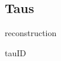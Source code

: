 \subsection{Taus}\label{chapter-HTT_analysis-section-objects-taus}

reconstruction \tauh~\cite{Khachatryan:2015dfa,Sirunyan:2018pgf}

tauID \cite{TauPOG,CMS-DP-2019-033}